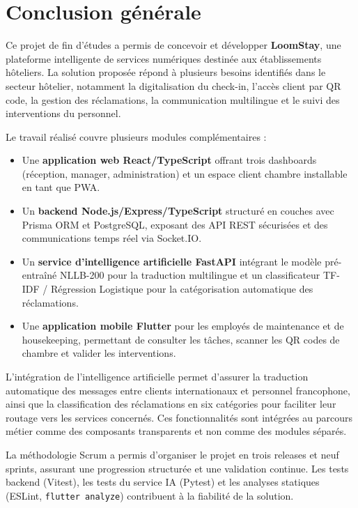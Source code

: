 \chapter*{Conclusion générale}

Ce projet de fin d'études a permis de concevoir et développer \textbf{LoomStay}, une plateforme intelligente de services numériques destinée aux établissements hôteliers. La solution proposée répond à plusieurs besoins identifiés dans le secteur hôtelier, notamment la digitalisation du check-in, l'accès client par QR code, la gestion des réclamations, la communication multilingue et le suivi des interventions du personnel.

Le travail réalisé couvre plusieurs modules complémentaires :
\begin{itemize}
    \item Une \textbf{application web React/TypeScript} offrant trois dashboards (réception, manager, administration) et un espace client chambre installable en tant que PWA.
    \item Un \textbf{backend Node.js/Express/TypeScript} structuré en couches avec Prisma ORM et PostgreSQL, exposant des API REST sécurisées et des communications temps réel via Socket.IO.
    \item Un \textbf{service d'intelligence artificielle FastAPI} intégrant le modèle pré-entraîné NLLB-200 pour la traduction multilingue et un classificateur TF-IDF / Régression Logistique pour la catégorisation automatique des réclamations.
    \item Une \textbf{application mobile Flutter} pour les employés de maintenance et de housekeeping, permettant de consulter les tâches, scanner les QR codes de chambre et valider les interventions.
\end{itemize}

L'intégration de l'intelligence artificielle permet d'assurer la traduction automatique des messages entre clients internationaux et personnel francophone, ainsi que la classification des réclamations en six catégories pour faciliter leur routage vers les services concernés. Ces fonctionnalités sont intégrées au parcours métier comme des composants transparents et non comme des modules séparés.

La méthodologie Scrum a permis d'organiser le projet en trois releases et neuf sprints, assurant une progression structurée et une validation continue. Les tests backend (Vitest), les tests du service IA (Pytest) et les analyses statiques (ESLint, \texttt{flutter analyze}) contribuent à la fiabilité de la solution.

